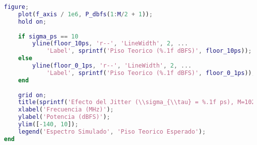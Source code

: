 \begin{lstlisting}[language=Matlab]
    figure;
    plot(f_axis / 1e6, P_dbfs(1:M/2 + 1));
    hold on;
    
    if sigma_ps == 10
        yline(floor_10ps, 'r--', 'LineWidth', 2, ...
            'Label', sprintf('Piso Teorico (%.1f dBFS)', floor_10ps));
    else
        yline(floor_0_1ps, 'r--', 'LineWidth', 2, ...
            'Label', sprintf('Piso Teorico (%.1f dBFS)', floor_0_1ps));
    end
    
    grid on;
    title(sprintf('Efecto del Jitter (\\sigma_{\\tau} = %.1f ps), M=1024', sigma_ps));
    xlabel('Frecuencia (MHz)');
    ylabel('Potencia (dBFS)');
    ylim([-140, 10]);
    legend('Espectro Simulado', 'Piso Teorico Esperado');
end
\end{lstlisting}
